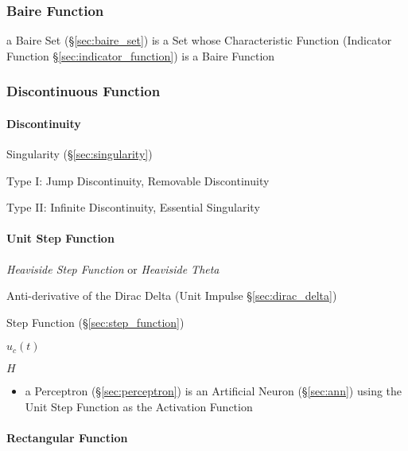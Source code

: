\subsubsection{Baire Function}\label{sec:baire_function}

a Baire Set (\S\ref{sec:baire_set}) is a Set whose Characteristic Function
(Indicator Function \S\ref{sec:indicator_function}) is a Baire Function




\subsubsection{Discontinuous Function}\label{sec:discontinuous_function}

\paragraph{Discontinuity}\label{sec:discontinuity}\hfill

\fist Singularity (\S\ref{sec:singularity})

Type I: Jump Discontinuity, Removable Discontinuity

Type II: Infinite Discontinuity, Essential Singularity



\paragraph{Unit Step Function}\label{sec:unit_step_function}\hfill


\emph{Heaviside Step Function} or \emph{Heaviside Theta}

Anti-derivative of the Dirac Delta (Unit Impulse \S\ref{sec:dirac_delta})

Step Function (\S\ref{sec:step_function})

$u_c(t)$

$H$

\begin{itemize}
  \item a Perceptron (\S\ref{sec:perceptron}) is an Artificial Neuron
    (\S\ref{sec:ann}) using the Unit Step Function as the Activation Function
\end{itemize}



\paragraph{Rectangular Function}\label{sec:rectangular_function}\hfill

